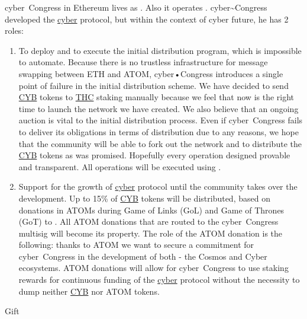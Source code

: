 \documentclass[8pt,oneside]{amsart}
\makeatletter
\newcommand{\linkgreen}[2]{\href{#1}{\color{green}{#2}}}
\renewcommand\subsection{\@startsection{subsection}
                                    {2}{\z@}
                                    {-3.25ex\@plus -1ex \@minus -.2ex}
                                    {0ex \@plus .2ex}
                                    {\play\Large}
                        }
\newcommand{\titleSection}[1]{\subsection{#1}}
\makeatother
\begin{document}
cyber~Congress in Ethereum lives as \linkgreen{https://mainnet.aragon.org/#/cybercongress/0x4feb2bcc5907e7779130c093eef8fb44502c1330/}{Aragon DAO}. Also it operates \linkgreen{https://cyberd.ai/account/cyber1809vlaew5u5p24tvmse9kvgytwwr3ej7txe7p6}{2-of-3 multisig in Cyber network}. cyber\~{}Congress developed the {\hyperref[cyber]{cyber}} protocol, but within the context of cyber future, he has 2 roles:
\begin{enumerate}
 \item To deploy and to execute the initial distribution program, which is impossible to automate. Because there is no trustless infrastructure for message swapping between ETH and ATOM, cyber•Congress introduces a single point of failure in the initial distribution scheme. We have decided to send {\hyperref[cyb]{CYB}} tokens to {\hyperref[thc]{THC}} staking manually because we feel that now is the right time to launch the network we have created. We also believe that an ongoing auction is vital to the initial distribution process. Even if cyber~Congress fails to deliver its obligations in terms of distribution due to any reasons, we hope that the community will be able to fork out the network and to distribute the {\hyperref[cyb]{CYB}} tokens as was promised. Hopefully every operation designed provable and transparent. All operations will be executed using \linkgreen{https://cyberd.ai/account/cyber12v6jzx9vea277aqj0nffll8ewvme35w94yv258}{special purpose 2-of-3 multisig in Cyber network}.
 \item Support for the growth of {\hyperref[cyber]{cyber}} protocol until the community takes over the development. Up to 15\% of {\hyperref[cyb]{CYB}} tokens will be distributed, based on donations in ATOMs during Game of Links (GoL) and Game of Thrones (GoT) to \linkgreen{https://www.mintscan.io/account/cosmos1809vlaew5u5p24tvmse9kvgytwwr3ej7vd7kgq}{cyber~Congress Cosmos 2-of-3 multisig}. All ATOM donations that are routed to the cyber~Congress multisig will become its property. The role of the ATOM donation is the following: thanks to ATOM we want to secure a commitment for cyber~Congress in the development of both - the Cosmos  and Cyber ecosystems. ATOM donations will allow for cyber~Congress to use staking rewards for continuous funding of the {\hyperref[cyber]{cyber}} protocol without the necessity to dump neither {\hyperref[cyb]{CYB}} nor ATOM tokens.
\end{enumerate}

\titleSection{Gift}\label{gift}
\end{document}
